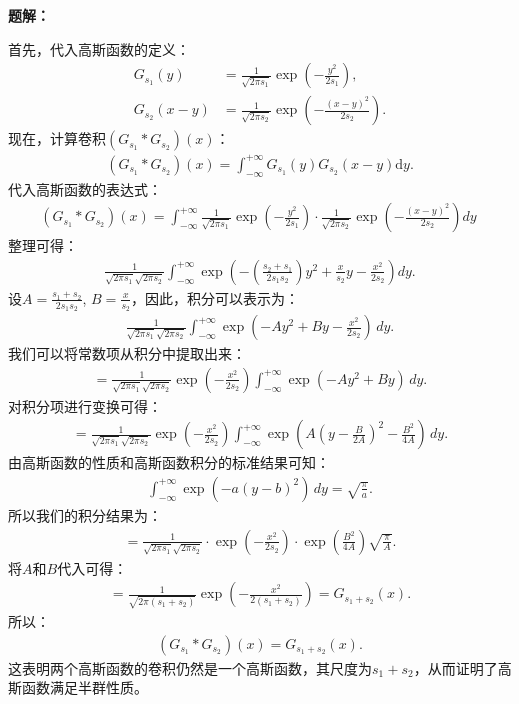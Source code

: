 \documentclass[UTF8]{ctexart}
\begin{document}
	
	\textbf{题解：}
	
	首先，代入高斯函数的定义：
	\begin{align*}
		G_{s_1}(y)&=\frac1{\sqrt{2\pi s_1}}\exp\left(-\frac{y^2}{2s_1}\right),\\G_{s_2}(x-y)&=\frac1{\sqrt{2\pi s_2}}\exp\left(-\frac{(x-y)^2}{2s_2}\right).
	\end{align*}
	现在，计算卷积$(G_{s_1}*G_{s_2})(x)$：
	\begin{align*}
		(G_{s_1}*G_{s_2})(x)=\int_{-\infty}^{+\infty}G_{s_1}(y)G_{s_2}(x-y)\mathrm{d}y.
	\end{align*}
	代入高斯函数的表达式：
	\begin{align*}
		(G_{s_1}*G_{s_2})(x) = \int_{-\infty}^{+\infty} \frac {1}{\sqrt {2\pi s_1}}\exp (-\frac {y^2}{2s_1}) \cdot \frac {1}{\sqrt {2\pi s_2}}\exp (-\frac {(x-y)^2}{2s_2}) dy \
	\end{align*}
	整理可得：
	\begin{align*}
		\frac {1}{\sqrt {2\pi s_1}\sqrt {2\pi s_2}}\int_{-\infty}^{+\infty} \exp (-(\frac {s_2+s_1}{2s_1s_2}) y^2 + \frac {x}{s_2} y - \frac {x^2}{2s_2}) dy.
	\end{align*}
	设$A=\frac{s_1+s_2}{2s_1s_2}$, $B=\frac{x}{s_2}$，因此，积分可以表示为：
	\begin{align*}
			\frac {1}{\sqrt {2\pi s_1}\sqrt {2\pi s_2}}\int_{-\infty}^{+\infty} \exp \left( -Ay^2 + By - \frac{x^2}{2s_2} \right) \, dy.
	\end{align*}
	我们可以将常数项从积分中提取出来：
	\begin{align*}
		=\frac {1}{\sqrt {2\pi s_1}\sqrt {2\pi s_2}}\exp\left(-\frac{x^2}{2s_2}\right)\int_{-\infty}^{+\infty} \exp\left(-Ay^2 + By\right) \, dy.
	\end{align*}
	对积分项进行变换可得：
	\begin{align*}
		=\frac {1}{\sqrt {2\pi s_1}\sqrt {2\pi s_2}}\exp\left(-\frac{x^2}{2s_2}\right)\int_{-\infty}^{+\infty} \exp\left(A\left(y - \frac{B}{2A}\right)^2 - \frac{B^2}{4A}\right) \, dy.
	\end{align*}
	由高斯函数的性质和高斯函数积分的标准结果可知：
	\begin{align*}
		\int_{-\infty}^{+\infty} \exp \left( - a(y - b)^2 \right) \, dy = \sqrt{\frac{\pi}{a}}.
	\end{align*}
	所以我们的积分结果为：
	\begin{align*}
		= \frac{1}{\sqrt{2\pi s_1} \sqrt{2\pi s_2}} \cdot \exp \left( -\frac{x^2}{2s_2} \right) \cdot \exp \left( \frac{B^2}{4A} \right) \sqrt{\frac{\pi}{A}}.
	\end{align*}
	将$A$和$B$代入可得：
	\begin{align*}
		= \frac{1}{\sqrt{2\pi(s_1+s_2)}}\exp(-\frac{x^2}{2(s_1+s_2)}) = G_{s_1 + s_2}(x).
	\end{align*}
	所以：
	\begin{align*}
		\left( G_{s_1} * G_{s_2} \right)(x) = G_{s_1 + s_2}(x).
	\end{align*}
	这表明两个高斯函数的卷积仍然是一个高斯函数，其尺度为$s_1+s_2$，从而证明了高斯函数满足半群性质。
	
\end{document}
